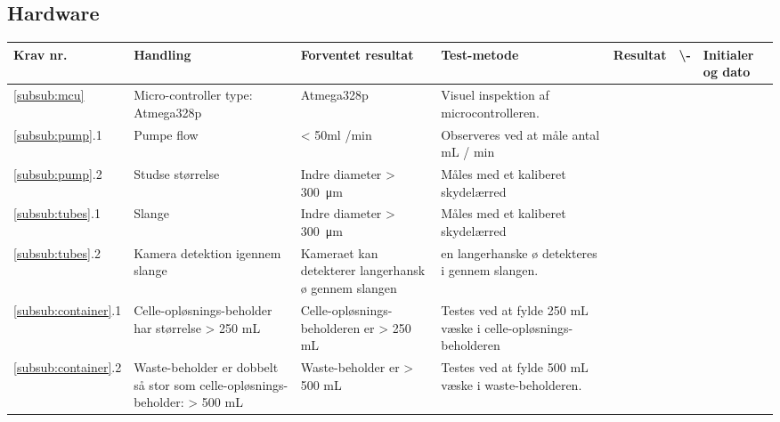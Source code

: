 \subsection{Hardware}
 \begin{center}
		\begin{longtable}{ | m{1.785cm} | m{1.785cm}| m{1.785cm}| m{1.785cm}| m{1.785cm}| m{1.785cm}|m{1.785cm}| } 
			\hline
			\textbf{Krav nr.} &\textbf{ Handling} & \textbf{Forventet resultat} & \textbf{Test-metode} &\textbf{Resultat} & \textbf{ \checkmark \textbackslash -} & \textbf{Initialer og dato} \\ 
			\hline
			
 \ref{subsub:mcu} &  Micro-controller type: Atmega328p
   & Atmega328p
    & Visuel inspektion af microcontrolleren.
    &  & & \\
			\hline
			 
			\ref{subsub:pump}.1 &  Pumpe flow
   & < 50ml /min
    & Observeres ved at måle antal mL / min
    &  & & \\
			\hline
			
			\ref{subsub:pump}.2 &  Studse størrelse
   & Indre diameter > \SI{300}{\micro\metre}
    & Måles med et kaliberet skydelærred 
    &  & & \\
			\hline
			
			\ref{subsub:tubes}.1 &  Slange
   & Indre diameter > \SI{300}{\micro\metre}
    & Måles med et kaliberet skydelærred 
    &  & & \\
			\hline
			
			\ref{subsub:tubes}.2 &  Kamera detektion igennem slange
   & Kameraet kan detekterer langerhansk ø gennem slangen
    & en langerhanske ø detekteres i gennem slangen.
    &  & & \\
			\hline
			
			\ref{subsub:container}.1 &  Celle-opløsnings-beholder har størrelse > 250 mL
   & Celle-opløsnings-beholderen er > 250 mL
    & Testes ved at fylde 250 mL væske i celle-opløsnings-beholderen
    &  & & \\
			\hline
		
		\ref{subsub:container}.2 &  Waste-beholder er dobbelt så stor som celle-opløsnings-beholder: > 500 mL
   & Waste-beholder er > 500 mL
    & Testes ved at fylde 500 mL væske i waste-beholderen.
    &  & & \\
			\hline	
			

\end{longtable}
\end{center}
